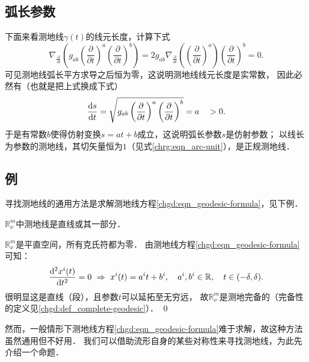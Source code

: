 \subsection{弧长参数}
下面来看测地线$\gamma(t)$的线元长度，计算下式
\begin{equation}
    \nabla_{\frac{\partial}{\partial t}} \left(g_{ab} \left(\frac{\partial}{\partial t}\right)^a
    \left(\frac{\partial}{\partial t}\right)^b    \right) =
    2 g_{ab} \nabla_{\frac{\partial}{\partial t}} \left( \left(\frac{\partial}{\partial t}\right)^a \right)
    \left(\frac{\partial}{\partial t}\right)^b     = 0.
\end{equation}
可见测地线弧长平方求导之后恒为零，这说明测地线线元长度是实常数，
因此必然有（也就是把上式换成下式）
\begin{equation}
    \frac{{\rm d}s}{{\rm d}t} =
    \sqrt{g_{ab} \left(\frac{\partial}{\partial t}\right)^a
        \left(\frac{\partial}{\partial t}\right)^b }
    = a \quad >0.
\end{equation}
于是有常数$b$使得仿射变换$s=at+b$成立，这说明弧长参数$s$是仿射参数；
以线长为参数的测地线，其切矢量恒为$1$（见式\eqref{chrg:eqn_arc-unit}），是正规测地线．



\subsection{例}
寻找测地线的通用方法是求解测地线方程\eqref{chgd:eqn_geodesic-formula}，见下例．

\begin{example}\label{chgd:exm_Rmnu}
    $\mathbb{R}^m_\nu$中测地线是直线或其一部分．
\end{example}
$\mathbb{R}^m_\nu$是平直空间，所有克氏符都为零．
由测地线方程\eqref{chgd:eqn_geodesic-formula}可知：
\begin{align}
    \frac{{\rm d}^2 x^i(t)}{{\rm d}t^2} = 0     \ \Rightarrow \
    x^i(t) = a^i t + b^i, \quad  a^i, b^i \in \mathbb{R},
    \quad t\in (-\delta,\delta)  .
\end{align}
很明显这是直线（段），且参数$t$可以延拓至无穷远，
故$\mathbb{R}^m_\nu$是测地完备的（完备性的定义见\ref{chgd:def_complete-geodesic}）．
\qed

然而，一般情形下测地线方程\eqref{chgd:eqn_geodesic-formula}难于求解，故这种方法虽然通用但不好用．
我们可以借助流形自身的某些对称性来寻找测地线，为此先介绍一个命题．

